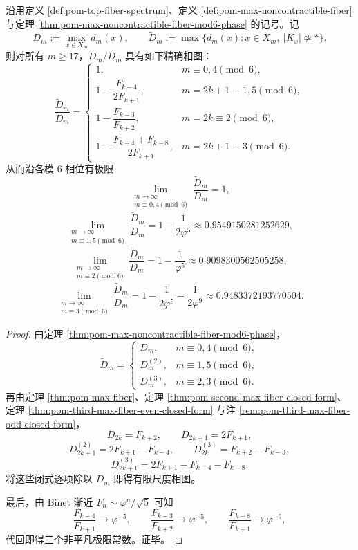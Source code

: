 \begin{theorem}\label{thm:derived-max-noncontractible-fiber-defect-constants}
沿用定义 \ref{def:pom-top-fiber-spectrum}、定义 \ref{def:pom-max-noncontractible-fiber} 与定理 \ref{thm:pom-max-noncontractible-fiber-mod6-phase} 的记号。记
\[
D_m:=\max_{x\in X_m}d_m(x),
\qquad
\widetilde D_m:=\max\{d_m(x):x\in X_m,\ |K_x|\not\simeq \ast\}.
\]
则对所有 \(m\ge 17\)，\(\widetilde D_m/D_m\) 具有如下精确相图：
\[
\frac{\widetilde D_m}{D_m}=
\begin{cases}
1, & m\equiv 0,4\pmod 6,\\[8pt]
1-\dfrac{F_{k-4}}{2F_{k+1}}, & m=2k+1\equiv 1,5\pmod 6,\\[12pt]
1-\dfrac{F_{k-3}}{F_{k+2}}, & m=2k\equiv 2\pmod 6,\\[12pt]
1-\dfrac{F_{k-4}+F_{k-8}}{2F_{k+1}}, & m=2k+1\equiv 3\pmod 6.
\end{cases}
\]
从而沿各模 \(6\) 相位有极限
\[
\lim_{\substack{m\to\infty\\ m\equiv 0,4\!\!\!\!\pmod 6}}
\frac{\widetilde D_m}{D_m}
=1,
\]
\[
\lim_{\substack{m\to\infty\\ m\equiv 1,5\!\!\!\!\pmod 6}}
\frac{\widetilde D_m}{D_m}
=1-\frac{1}{2\varphi^{5}}
\approx 0.9549150281252629,
\]
\[
\lim_{\substack{m\to\infty\\ m\equiv 2\!\!\!\!\pmod 6}}
\frac{\widetilde D_m}{D_m}
=1-\frac{1}{\varphi^{5}}
\approx 0.9098300562505258,
\]
\[
\lim_{\substack{m\to\infty\\ m\equiv 3\!\!\!\!\pmod 6}}
\frac{\widetilde D_m}{D_m}
=1-\frac{1}{2\varphi^{5}}-\frac{1}{2\varphi^{9}}
\approx 0.9483372193770504.
\]
\end{theorem}
\begin{proof}
由定理 \ref{thm:pom-max-noncontractible-fiber-mod6-phase}，
\[
\widetilde D_m=
\begin{cases}
D_m, & m\equiv 0,4\pmod 6,\\[2pt]
D_m^{(2)}, & m\equiv 1,5\pmod 6,\\[2pt]
D_m^{(3)}, & m\equiv 2,3\pmod 6.
\end{cases}
\]
再由定理 \ref{thm:pom-max-fiber}、定理 \ref{thm:pom-second-max-fiber-closed-form}、定理 \ref{thm:pom-third-max-fiber-even-closed-form} 与注 \ref{rem:pom-third-max-fiber-odd-closed-form}，
\[
D_{2k}=F_{k+2},\qquad D_{2k+1}=2F_{k+1},
\]
\[
D_{2k+1}^{(2)}=2F_{k+1}-F_{k-4},
\qquad
D_{2k}^{(3)}=F_{k+2}-F_{k-3},
\]
\[
D_{2k+1}^{(3)}=2F_{k+1}-F_{k-4}-F_{k-8}.
\]
将这些闭式逐项除以 \(D_m\) 即得有限尺度相图。

最后，由 Binet 渐近 \(F_n\sim \varphi^n/\sqrt5\) 可知
\[
\frac{F_{k-4}}{F_{k+1}}\to \varphi^{-5},
\qquad
\frac{F_{k-3}}{F_{k+2}}\to \varphi^{-5},
\qquad
\frac{F_{k-8}}{F_{k+1}}\to \varphi^{-9},
\]
代回即得三个非平凡极限常数。证毕。
\end{proof}

